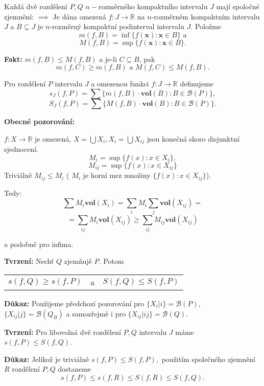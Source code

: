 \documentclass[../main.tex]{subfiles}
\begin{document}
Každá dvě rozdělení $P,Q$ $n-$rozměrného kompaktního intervalu $J$ mají spoločné zjemnění:
\vspace{5mm}
\noindent
\textbf{$\implies$} Je dána omezená $f: J \rightarrow \mathbb{R}$ na $n$-rozměrném kompaktním intervalu $J$ a $B \subseteq J$ je 
$n$-rozměrný kompaktní podinterval intervalu $J$. Položme
\[m(f,B) = \inf\{f(\textbf{x}) : \textbf{x} \in B\} \text{ a}\]
\[M(f,B) = \sup\{f(\textbf{x}) : \textbf{x} \in B\}.\]

\textbf{Fakt:} $m(f,B) \leq M(f,B)$ a je-li $C \subseteq B$, pak 
\[m(f,C) \geq m(f,B) \text{ a } M(f,C) \leq M(f,B).\]

Pro rozdělení $P$ intervalu $J$ a omezenou funkci $f : J \rightarrow \mathbb{R}$ definujeme 
\[s_J(f,P) = \sum \{m(f,B) \cdot \textbf{vol}(B) : B \in \mathcal{B}(P)\},\]
\[S_J(f,P) = \sum \{M(f,B) \cdot \textbf{vol}(B) : B \in \mathcal{B}(P)\}.\]

\textbf{Obecné pozorování:}

$f: X \rightarrow \mathbb{R}$ je omezená, $X = \bigcup X_i, X_i = \bigcup X_{ij}$ jsou konečná skoro disjunktní sjednocení.
\[M_i = \sup\{f(x) : x \in X_i\},\]
\[M_{ij} = \sup\{f(x) : x \in X_{ij}\}\]
\newpage
Triviálně $M_{ij} \leq M_i$ ( $M_i$ je horní mez množiny $\{f(x) : x \in X_{ij}\}$).

Tedy:
\[\sum M_i \textbf{vol}(X_i) = \sum_i M_i \sum_j \textbf{vol}(X_{ij}) = \]
\[= \sum_{ij}M_i \textbf{vol}(X_{ij}) \geq \sum_{ij} M_{ij} \textbf{vol}(X_{ij})\]

a podobně pro infima.

\textbf{Tvrzení:} Nechť $Q$ zjemňujě $P$. Potom
\begin{center}
    \begin{tabular}{c c c}
        $s(f,Q) \geq s(f,P)$ & a & $S(f,Q) \leq S(f,P)$
    \end{tabular}
\end{center}

\vspace{5mm}
\noindent
\textbf{Důkaz:} Použijeme předchozí pozorování pro $\{X_i | i\} = \mathcal{B}(P)$, $\{X_{ij} | j\} = \mathcal{B}(Q_B)$ a samozřejmě
i pro $\{X_{ij} | ij\} = \mathcal{B}(Q).$

\textbf{Tvrzení:} Pro libovolná dvě rozdělení $P,Q$ intervalu $J$ máme $s(f,P) \leq S(f,Q)$.

\vspace{5mm}
\noindent
\textbf{Důkaz:} Jelikož je triviálně $s(f,P) \leq S(f,P),$ použitím společného zjemnění $R$ rozdělení $P,Q$ dostaneme
\[s(f,P) \leq s(f,R) \leq S(f,R) \leq S(f,Q).\]
\end{document}
